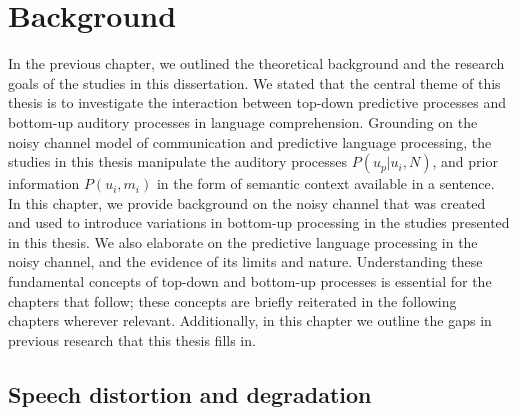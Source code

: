 \documentclass[a4paper, nobind]{templates/ociamthesis}
\begin{document}
\hypertarget{chapter-background}{%
\chapter{Background}\label{chapter-background}}

In the previous chapter, we outlined the theoretical background and the research goals of the studies in this dissertation.
We stated that the central theme of this thesis is to investigate the interaction between top-down predictive processes and bottom-up auditory processes in language comprehension.
Grounding on the noisy channel model of communication and predictive language processing,
the studies in this thesis manipulate the auditory processes \(P(u_p|u_i,N)\), and prior information \(P(u_i,m_i)\) in the form of semantic context available in a sentence.
In this chapter, we provide background on the noisy channel that was created and used to introduce variations in bottom-up processing in the studies presented in this thesis.
We also elaborate on the predictive language processing in the noisy channel, and the evidence of its limits and nature.
Understanding these fundamental concepts of top-down and bottom-up processes is essential for the chapters that follow;
these concepts are briefly reiterated in the following chapters wherever relevant.
Additionally, in this chapter we outline the gaps in previous research that this thesis fills in.

\hypertarget{distortion-degradation}{%
\section{Speech distortion and degradation}\label{distortion-degradation}}
\end{document}

